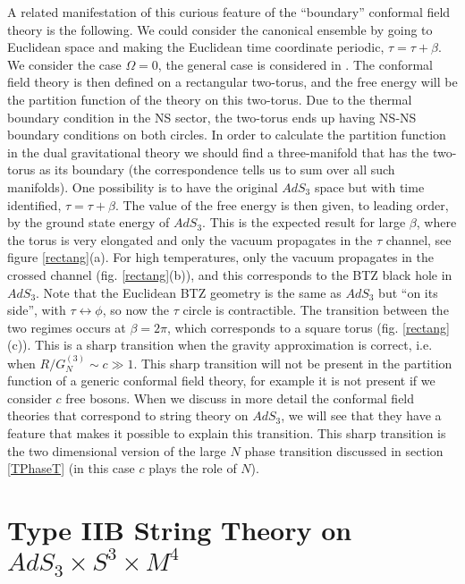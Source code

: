 A related  manifestation of this curious feature of the ``boundary'' 
conformal field theory  is the following. 
We could consider the canonical ensemble by going to Euclidean 
space and  making the Euclidean time coordinate periodic, $ \tau =
\tau + \beta$. We consider the case $\Omega =0$, the general
case is considered in \cite{Maldacena:1998bw}.
 The conformal field theory 
is then defined on a rectangular two-torus, and the free energy will 
be the partition function of the theory on this two-torus. 
Due to the thermal boundary condition in the NS sector, the 
two-torus ends up having   NS-NS boundary conditions on both circles.
In order to calculate the partition function in the dual gravitational 
theory 
 we should find a three-manifold that has the two-torus as its
 boundary (the correspondence tells us to sum over all
 such manifolds).
One possibility is to have the  original $AdS_3$ space but with time
identified, $ \tau = \tau + \beta$. 
The  value of the free energy is then given, to leading order,  
by the ground state energy of $AdS_3$.
This is the expected result 
for large $\beta$, where the torus is very elongated and only the 
vacuum propagates in the $\tau$ channel, see figure \ref{rectang}(a).
For high temperatures, only the vacuum propagates in the crossed 
channel (fig. \ref{rectang}(b)), and this corresponds to the BTZ black hole
in $AdS_3$. Note that the Euclidean BTZ  geometry is the same as $AdS_3$ but 
``on its side'', with $ \tau \leftrightarrow \phi$, so now
the $\tau$ circle is contractible.
 The transition between the two regimes occurs at $ \beta = 2 
\pi $, which corresponds to a square torus (fig. \ref{rectang}(c)).
This is a sharp transition when the gravity approximation is correct, 
i.e. when $ R/G_N^{(3)}\sim c  \gg 1 $.
 This sharp transition will not be present in the partition function of
a generic  conformal field theory, for example it is not present if 
we consider $c$ free bosons. When we discuss in more detail the conformal
field theories that correspond to string theory on $AdS_3$, 
we  will see that they have a  feature that makes it possible 
to explain  this transition. This sharp transition is the
two dimensional version of the large $N$  phase transition
discussed in section \ref{TPhaseT} \cite{Witten:1998zw}
(in this case $c$ plays the role of $N$). 


 


\section{Type IIB String Theory on $AdS_3 \times S^3 \times M^4$}

